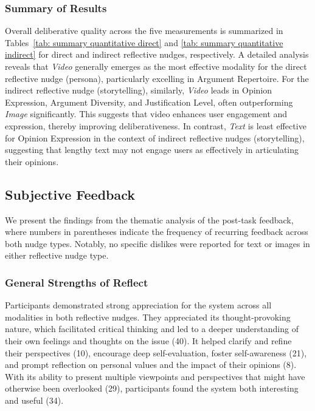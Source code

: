 \subsubsection{Summary of Results}
Overall deliberative quality across the five measurements is summarized in Tables~\ref{tab: summary quantitative direct} and \ref{tab: summary quantitative indirect} for direct and indirect reflective nudges, respectively. A detailed analysis reveals that \emph{Video} generally emerges as the most effective modality for the direct reflective nudge (persona), particularly excelling in Argument Repertoire. For the indirect reflective nudge (storytelling), similarly, \emph{Video} leads in Opinion Expression, Argument Diversity, and Justification Level, often outperforming \emph{Image} significantly. This suggests that video enhances user engagement and expression, thereby improving deliberativeness. In contrast, \emph{Text} is least effective for Opinion Expression in the context of indirect reflective nudges (storytelling), suggesting that lengthy text may not engage users as effectively in articulating their opinions.


\subsection{Subjective Feedback}
\label{sec: qualitative}
We present the findings from the thematic analysis of the post-task feedback, where numbers in parentheses indicate the frequency of recurring feedback across both nudge types. Notably, no specific dislikes were reported for text or images in either reflective nudge type.

\subsubsection{General Strengths of Reflect}
Participants demonstrated strong appreciation for the system across all modalities in both reflective nudges. They appreciated its thought-provoking nature, which facilitated critical thinking and led to a deeper understanding of their own feelings and thoughts on the issue (40). It helped clarify and refine their perspectives (10), encourage deep self-evaluation, foster self-awareness (21), and prompt reflection on personal values and the impact of their opinions (8). 
With its ability to present multiple viewpoints and perspectives that might have otherwise been overlooked (29), participants found the system both interesting and useful (34). 


